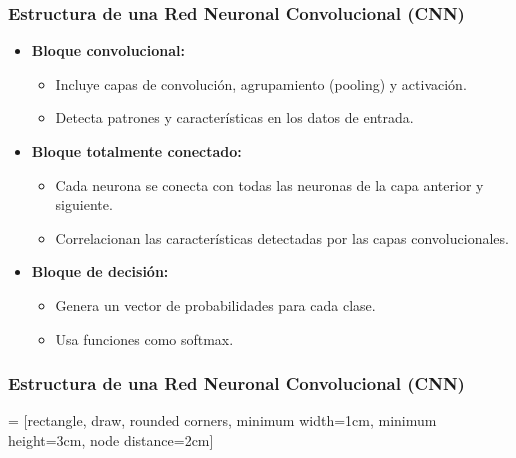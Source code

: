 \begin{frame}
    \frametitle{Estructura de una Red Neuronal Convolucional (CNN)}

    \begin{itemize}[leftmargin=*]
        \item \textbf{Bloque convolucional:}
        \begin{itemize}[leftmargin=*]
            \item Incluye capas de convolución, agrupamiento (pooling) y activación.
            \item Detecta patrones y características en los datos de entrada.
        \end{itemize}

        \item \textbf{Bloque totalmente conectado:}
        \begin{itemize}[leftmargin=*]
            \item Cada neurona se conecta con todas las neuronas de la capa anterior y siguiente.
            \item Correlacionan las características detectadas por las capas convolucionales.
        \end{itemize}

        \item \textbf{Bloque de decisión:}
        \begin{itemize}[leftmargin=*]
            \item Genera un vector de probabilidades para cada clase.
            \item Usa funciones como softmax.
        \end{itemize}
    \end{itemize}

\end{frame}


\begin{frame}[fragile]
    \frametitle{Estructura de una Red Neuronal Convolucional (CNN)}

    \begin{center}
 = [rectangle, draw, rounded corners, minimum width=1cm, minimum height=3cm, node distance=2cm]
    \end{center}
\end{frame}


